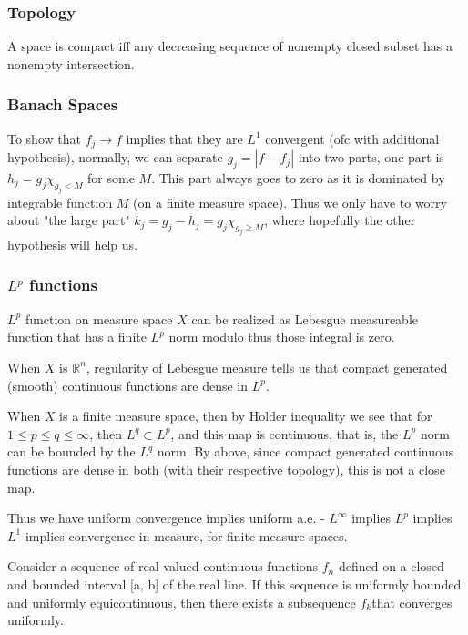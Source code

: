 \documentclass[main.tex]{subfiles}
\begin{document}
\subsubsection{Topology}
A space is compact iff any decreasing sequence of nonempty closed subset has a nonempty intersection.

\subsubsection{Banach Spaces}
To show that $f_j \rightarrow f$ implies that they are $L^1$ convergent (ofc with additional hypothesis), normally, we can separate $g_j = |f - f_j|$ into two parts, one part is $h_j = g_j \chi_{g_j < M}$ for some $M$. This part always goes to zero as it is dominated by integrable function $M$ (on a finite measure space). Thus we only have to worry about "the large part" $k_j = g_j - h_j = g_j \chi_{g_j \geq M}$, where hopefully the other hypothesis will help us.

\subsubsection{$L^p$ functions}

$L^p$ function on measure space $X$ can be realized as Lebesgue measureable function that has a finite $L^p$ norm modulo thus those integral is zero.

When $X$ is $\mathbb{R}^n$, regularity of Lebesgue measure tells us that compact generated (smooth) continuous functions are dense in $L^p$.

When $X$ is a finite measure space, then by Holder inequality we see that for $1 \leq p \leq q \leq \infty$, then $L^q \subset L^p$, and this map is continuous, that is, the $L^p$ norm can be bounded by the $L^q$ norm. By above, since compact generated continuous functions are dense in both (with their respective topology), this is not a close map.

Thus we have uniform convergence implies uniform a.e. - $L^\infty$ implies $L^p$ implies $L^1$ implies convergence in measure, for finite measure spaces.

\begin{theorem}
Consider a sequence of real-valued continuous functions ${f}_n$ defined on a closed and bounded interval [a, b] of the real line. If this sequence is uniformly bounded and uniformly equicontinuous, then there exists a subsequence ${f}_k$that converges uniformly.
\end{theorem}
\end{document}
